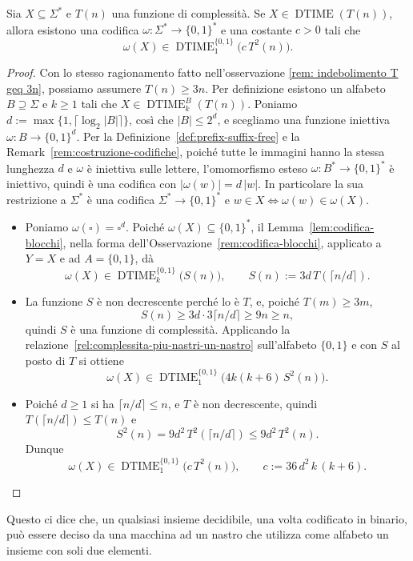 \begin{coro}\label{cor:binario-codifica}
Sia $X\subseteq\Sigma^*$ e $T(n)$ una funzione di complessità. Se
$X\in\operatorname{DTIME}(T(n))$, allora esistono una codifica
$\omega\colon\Sigma^*\to\{0,1\}^*$ e una costante $c>0$ tali che
\[
  \omega(X)\in\operatorname{DTIME}^{\{0,1\}}_1\big(c\,T^2(n)\big).
\]
\begin{proof}
Con lo stesso ragionamento fatto nell'osservazione
\ref{rem: indebolimento T geq 3n}, possiamo
assumere $T(n)\geq 3n$.
Per definizione esistono un alfabeto $B\supseteq\Sigma$ e $k\geq 1$ tali che
$X\in\operatorname{DTIME}^B_k(T(n))$. Poniamo $d:=\max\{1,\lceil\log_2|B|\rceil\}$, così
che $|B|\leq 2^d$, e scegliamo una funzione iniettiva $\omega\colon B\to\{0,1\}^d$.
Per la Definizione~\ref{def:prefix-suffix-free} e la
Remark~\ref{rem:costruzione-codifiche}, poiché tutte le immagini hanno la stessa
lunghezza $d$ e $\omega$ è iniettiva sulle lettere, l'omomorfismo esteso
$\omega\colon B^*\to\{0,1\}^*$ è iniettivo, quindi è una codifica con $|\omega(w)|=d\,|w|$. In particolare la sua
restrizione a $\Sigma^*$ è una codifica $\Sigma^*\to\{0,1\}^*$ e
$w\in X\iff\omega(w)\in\omega(X)$.
\begin{itemize}
\item[Passo 1:] Poniamo $\omega(\square)=\square^d$. Poiché
$\omega(X)\subseteq\{0,1\}^*$, il Lemma~\ref{lem:codifica-blocchi}, nella forma
dell'Osservazione~\ref{rem:codifica-blocchi}, applicato a $Y=X$ e ad
$A=\{0,1\}$, dà
\[
  \omega(X)\in\operatorname{DTIME}^{\{0,1\}}_k\big(S(n)\big),
  \qquad S(n):=3d\,T(\lceil n/d\rceil).
\]

\item[Passo 2:] La funzione $S$ è non decrescente perché
lo è $T$, e, poiché $T(m)\geq 3m$,
\[
  S(n)\geq 3d\cdot 3\lceil n/d\rceil\geq 9n\geq n,
\]
quindi $S$ è una funzione di complessità. Applicando la
relazione~\eqref{rel:complessita-piu-nastri-un-nastro} sull'alfabeto $\{0,1\}$ e con
$S$ al posto di $T$ si ottiene
\[
  \omega(X)\in\operatorname{DTIME}^{\{0,1\}}_1\big(4k(k+6)\,S^2(n)\big).
\]

\item[Passo 3:] Poiché $d\geq1$ si ha $\lceil n/d\rceil\leq n$, e $T$ è non
decrescente, quindi $T(\lceil n/d\rceil)\leq T(n)$ e
\[
  S^2(n)=9d^2\,T^2(\lceil n/d\rceil)\leq 9d^2\,T^2(n).
\]
Dunque
\[
  \omega(X)\in\operatorname{DTIME}^{\{0,1\}}_1\big(c\,T^2(n)\big),
  \qquad c:=36\,d^2\,k\,(k+6).
\]
\end{itemize}
\end{proof}
\end{coro}
Questo ci dice che,
un qualsiasi insieme decidibile, una volta codificato in binario,
può essere
deciso da una macchina ad un nastro
che utilizza come alfabeto
un insieme con soli due elementi.



